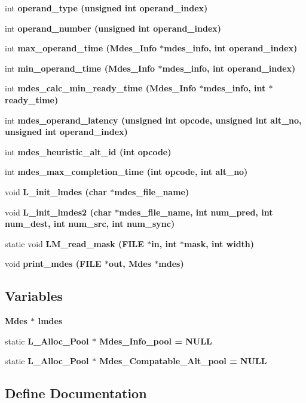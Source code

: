 \begin{CompactItemize}
\item 
int \bf{operand\_\-type} (unsigned int operand\_\-index)
\item 
int \bf{operand\_\-number} (unsigned int operand\_\-index)
\item 
int \bf{max\_\-operand\_\-time} (\bf{Mdes\_\-Info} $\ast$mdes\_\-info, int operand\_\-index)
\item 
int \bf{min\_\-operand\_\-time} (\bf{Mdes\_\-Info} $\ast$mdes\_\-info, int operand\_\-index)
\item 
int \bf{mdes\_\-calc\_\-min\_\-ready\_\-time} (\bf{Mdes\_\-Info} $\ast$mdes\_\-info, int $\ast$ready\_\-time)
\item 
int \bf{mdes\_\-operand\_\-latency} (unsigned int opcode, unsigned int alt\_\-no, unsigned int operand\_\-index)
\item 
int \bf{mdes\_\-heuristic\_\-alt\_\-id} (int opcode)
\item 
int \bf{mdes\_\-max\_\-completion\_\-time} (int opcode, int alt\_\-no)
\item 
void \bf{L\_\-init\_\-lmdes} (char $\ast$mdes\_\-file\_\-name)
\item 
void \bf{L\_\-init\_\-lmdes2} (char $\ast$mdes\_\-file\_\-name, int num\_\-pred, int num\_\-dest, int num\_\-src, int num\_\-sync)
\item 
static void \bf{LM\_\-read\_\-mask} (FILE $\ast$in, int $\ast$mask, int width)
\item 
void \bf{print\_\-mdes} (FILE $\ast$out, \bf{Mdes} $\ast$mdes)
\end{CompactItemize}
\subsection*{Variables}
\begin{CompactItemize}
\item 
\bf{Mdes} $\ast$ \bf{lmdes}
\item 
static \bf{L\_\-Alloc\_\-Pool} $\ast$ \bf{Mdes\_\-Info\_\-pool} = \bf{NULL}
\item 
static \bf{L\_\-Alloc\_\-Pool} $\ast$ \bf{Mdes\_\-Compatable\_\-Alt\_\-pool} = \bf{NULL}
\end{CompactItemize}


\subsection{Define Documentation}
